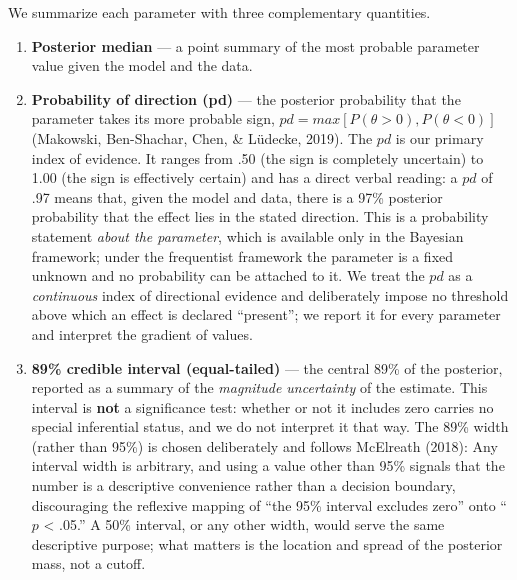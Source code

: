 \documentclass[
  english,
  man,floatsintext]{apa6}
\begin{document}
We summarize each parameter with three complementary quantities.

\begin{enumerate}
\def\labelenumi{\arabic{enumi}.}
\item
  \textbf{Posterior median} --- a point summary of the most probable parameter value given the
  model and the data.
\item
  \textbf{Probability of direction (pd)} --- the posterior probability that the parameter takes
  its more probable sign, \(pd = max[P(\theta > 0), P(\theta < 0)]\) (Makowski, Ben-Shachar, Chen, \& Lüdecke, 2019). The \(pd\) is our primary index of evidence. It ranges from .50 (the sign is completely uncertain) to
  1.00 (the sign is effectively certain) and has a direct verbal reading: a \(pd\) of .97
  means that, given the model and data, there is a 97\% posterior probability that the
  effect lies in the stated direction. This is a probability statement \emph{about the
  parameter}, which is available only in the Bayesian framework; under the frequentist
  framework the parameter is a fixed unknown and no probability can be attached to it. We
  treat the \(pd\) as a \emph{continuous} index of directional evidence and deliberately impose no
  threshold above which an effect is declared ``present''; we report it for every parameter
  and interpret the gradient of values.
\item
  \textbf{89\% credible interval (equal-tailed)} --- the central 89\% of the posterior, reported
  as a summary of the \emph{magnitude uncertainty} of the estimate. This interval is \textbf{not} a
  significance test: whether or not it includes zero carries no special inferential
  status, and we do not interpret it that way. The 89\% width (rather than 95\%) is chosen
  deliberately and follows McElreath (2018): Any interval width is arbitrary, and using a
  value other than 95\% signals that the number is a descriptive convenience rather than a
  decision boundary, discouraging the reflexive mapping of ``the 95\% interval excludes
  zero'' onto ``\(p\) \textless{} .05.'' A 50\% interval, or any other width, would serve the same
  descriptive purpose; what matters is the location and spread of the posterior mass, not
  a cutoff.
\end{enumerate}
\end{document}
